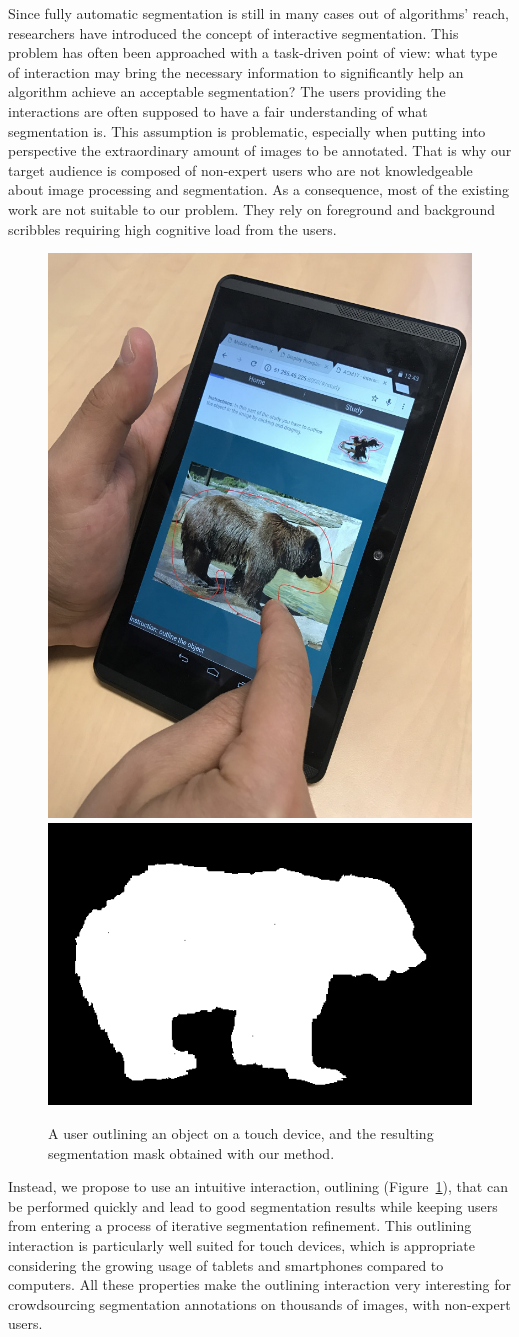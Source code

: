 Since fully automatic segmentation is still in many cases
out of algorithms' reach, researchers have introduced
the concept of interactive segmentation.
This problem has often been approached with a task-driven point of view:
what type of interaction may bring the necessary information
to significantly help an algorithm achieve an acceptable segmentation?
The users providing the interactions are often supposed
to have a fair understanding of what segmentation is.
This assumption is problematic, especially when putting
into perspective the extraordinary amount of images to be annotated.
That is why our target audience is composed
of non-expert users who are not knowledgeable
about image processing and segmentation.
As a consequence, most of the existing work are not suitable to our problem.
They rely on foreground and background scribbles
requiring high cognitive load from the users.


\begin{figure}[h]
\centering
\includegraphics[width=0.4\columnwidth]{assets/img/photo_tablet.jpg}
\hfill
\includegraphics[width=0.55\columnwidth]{assets/img/bear_02_mask.png}
\caption{A user outlining an object on a touch device,
and the resulting segmentation mask obtained with our method.}%
\label{fig:bigpicture}
\end{figure}


Instead, we propose to use an intuitive interaction,
outlining (Figure~\ref{fig:bigpicture}),
that can be performed quickly and lead to good segmentation results
while keeping users from entering a process
of iterative segmentation refinement.
This outlining interaction is particularly well suited
for touch devices, which is appropriate considering the growing
usage of tablets and smartphones compared to computers.
All these properties make the outlining interaction very interesting
for crowdsourcing segmentation annotations on thousands of images,
with non-expert users.


